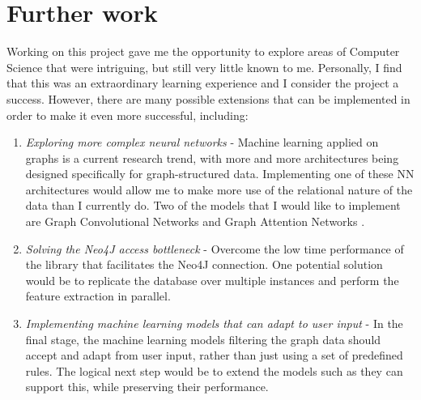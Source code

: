 	\section{Further work}
		Working on this project gave me the opportunity to explore areas of Computer Science that were intriguing, but still very little known to me. Personally, I find that this was an extraordinary learning experience and I consider the project a success. However, there are many possible extensions that can be implemented in order to make it even more successful, including:
		\begin{enumerate}
			\item \textit{Exploring more complex neural networks} - Machine learning applied on graphs is a current research trend, with more and more architectures being designed specifically for graph-structured data. Implementing one of these NN architectures would allow me to make more use of the relational nature of the data than I currently do. Two of the models that I would like to implement are Graph Convolutional Networks \cite{kipf2017semi} and Graph Attention Networks \cite{2017arXiv171010903V}.
			
			\item \textit{Solving the Neo4J access bottleneck} - Overcome the low time performance of the library that facilitates the Neo4J connection. One potential solution would be to replicate the database over multiple instances and perform the feature extraction in parallel. 
				
			\item \textit{Implementing machine learning models that can adapt to user input} - In the final stage, the machine learning models filtering the graph data should accept and adapt from user input, rather than just using a set of predefined rules. The logical next step would be to extend the models such as they can support this, while preserving their performance.
	\end{enumerate}
	
